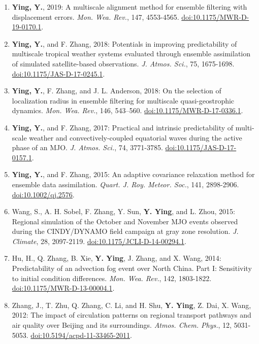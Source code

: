 \begin{enumerate}
\item \textbf{Ying, Y.}, 2019: A multiscale alignment method for ensemble filtering with displacement errors. 
\textit{Mon. Wea. Rev.}, 147, 4553-4565. 
\href{https://doi.org/10.1175/MWR-D-19-0170.1}{doi:10.1175/MWR-D-19-0170.1}.

\item \textbf{Ying, Y.}, and F. Zhang, 2018: Potentials in improving predictability of multiscale tropical weather systems evaluated through ensemble assimilation of simulated satellite-based observations. 
\textit{J. Atmos. Sci.}, 75, 1675-1698. 
\href{https://doi.org/10.1175/JAS-D-17-0245.1}{doi:10.1175/JAS-D-17-0245.1}.

\item \textbf{Ying, Y.}, F. Zhang, and J. L. Anderson, 2018: On the selection of localization radius in ensemble filtering for multiscale quasi-geostrophic dynamics. 
\textit{Mon. Wea. Rev.}, 146, 543–560. 
\href{https://doi.org/10.1175/MWR-D-17-0336.1}{doi:10.1175/MWR-D-17-0336.1}.

\item \textbf{Ying, Y.}, and F. Zhang, 2017: Practical and intrinsic predictability of multi-scale weather and convectively-coupled equatorial waves during the active phase of an MJO. 
\textit{J. Atmos. Sci.}, 74, 3771-3785. 
\href{https://doi.org/10.1175/JAS-D-17-0157.1}{doi:10.1175/JAS-D-17-0157.1}.

\item \textbf{Ying, Y.}, and F. Zhang, 2015: An adaptive covariance relaxation method for ensemble data assimilation. 
\textit{Quart. J. Roy. Meteor. Soc.}, 141, 2898-2906. 
\href{https://doi.org/10.1002/qj.2576}{doi:10.1002/qj.2576}.

\item Wang, S., A. H. Sobel, F. Zhang, Y. Sun, \textbf{Y. Ying}, and L. Zhou, 2015: Regional simulation of the October and November MJO events observed during the CINDY/DYNAMO field campaign at gray zone resolution. 
\textit{J. Climate}, 28, 2097-2119. 
\href{https://doi.org/10.1175/JCLI-D-14-00294.1}{doi:10.1175/JCLI-D-14-00294.1}.

\item Hu, H., Q. Zhang, B. Xie, \textbf{Y. Ying}, J. Zhang, and X. Wang, 2014: Predictability of an advection fog event over North China. Part I: Sensitivity to initial condition differences. 
\textit{Mon. Wea. Rev.}, 142, 1803-1822. 
\href{https://doi.org/10.1175/MWR-D-13-00004.1}{doi:10.1175/MWR-D-13-00004.1}.

\item Zhang, J., T. Zhu, Q. Zhang, C. Li, and H. Shu, \textbf{Y. Ying}, Z. Dai, X. Wang, 2012: The impact of circulation patterns on regional transport pathways and air quality over Beijing and its surroundings. 
\textit{Atmos. Chem. Phys.}, 12, 5031-5053. 
\href{https://doi.org/10.5194/acpd-11-33465-2011}{doi:10.5194/acpd-11-33465-2011}.


\end{enumerate}
